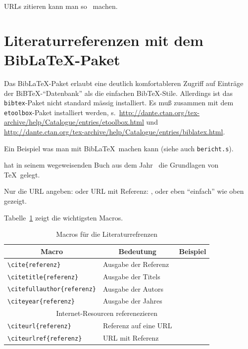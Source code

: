 URLs zitieren kann man so~\cite{dante.2010a} machen.

\section{Literaturreferenzen mit dem Bib\LaTeX-Paket}

Das Bib\LaTeX-Paket erlaubt eine deutlich komfortableren Zugriff auf Einträge der
BiB\TeX-"`Datenbank"' als die einfachen Bib\TeX-Stile. Allerdings ist das \texttt{bibtex}-Paket
nicht standard mässig installiert. Es muß zusammen mit dem \texttt{etoolbox}-Paket installiert
werden, s.\
\url{http://dante.ctan.org/tex-archive/help/Catalogue/entries/etoolbox.html} und\\
\url{http://dante.ctan.org/tex-archive/help/Catalogue/entries/biblatex.html}.


Ein Beispiel was man mit Bib\LaTeX\ machen kann (siehe auch \texttt{bericht.s}).

 hat in seinem wegeweisenden Buch
 aus dem Jahr~\citeyear{knuth.1984a}
die Grundlagen von \TeX\ gelegt.

Nur die URL angeben:  oder URL mit Referenz:
\citeurlref{dante.2010a}, oder eben "`einfach"' wie oben gezeigt.

Tabelle~\ref{bibtex-macros} zeigt die wichtigsten Macros.
\begin{table}
    \begin{center}
        \small
        \begin{tabular}{|l|l|l|}
            \hline
            \multicolumn{1}{|c}{Macro}        & \multicolumn{1}{|c}{Bedeutung} &    \multicolumn{1}{|c|}{Beispiel} \\\hline\hline
            \verb+\cite{referenz}+ & Ausgabe der Referenz & \cite{knuth.1984a}             \\
            \verb+\citetitle{referenz}+ & Ausgabe der Titels & \citetitle{knuth.1984a}        \\
            \verb+\citefullauthor{referenz}+ & Ausgabe der Autors & \citefullauthor{knuth.1984a}   \\
            \verb+\citeyear{referenz}+ & Ausgabe der Jahres & \citeyear{knuth.1984a}         \\\hline
            \multicolumn{3}{|c|}{Internet-Resourcen referenezieren}                                             \\\hline
            \verb+\citeurl{referenz}+ & Referenz auf eine URL & \citeurl{dante.2010a}          \\
            \verb+\citeurlref{referenz}+ & URL mit Referenz & \citeurlref{dante.2010a}       \\\hline
        \end{tabular}
    \end{center}
    \caption{\label{bibtex-macros}Macros für die Literaturrefrenzen}
\end{table}

